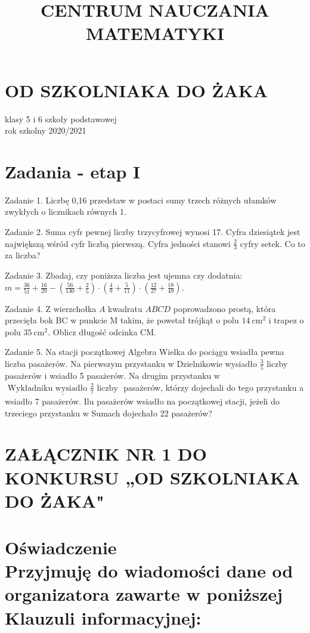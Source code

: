 \documentclass[10pt]{article}
\title{CENTRUM NAUCZANIA MATEMATYKI }
\author{}
\date{}
\begin{document}
\maketitle
\section*{OD SZKOLNIAKA DO ŻAKA}
klasy 5 i 6 szkoły podstawowej\\
rok szkolny 2020/2021

\section*{Zadania - etap I}
Zadanie 1. Liczbę 0,16 przedstaw w postaci sumy trzech różnych ułamków zwykłych o licznikach równych 1.

Zadanie 2. Suma cyfr pewnej liczby trzycyfrowej wynosi 17. Cyfra dziesiątek jest największą wśród cyfr liczbą pierwszą. Cyfra jedności stanowi \(\frac{2}{3}\) cyfry setek. Co to za liczba?

Zadanie 3. Zbadaj, czy poniższa liczba jest ujemna czy dodatnia:\\
\(m=\frac{36}{51}+\frac{16}{29}-\left(\frac{56}{130}+\frac{2}{5}\right) \cdot\left(\frac{4}{9}+\frac{5}{11}\right) \cdot\left(\frac{12}{27}+\frac{18}{49}\right)\).

Zadanie 4. Z wierzchołka \(A\) kwadratu \(A B C D\) poprowadzono prostą, która przecięła bok BC w punkcie M takim, że powstał trójkąt o polu \(14 \mathrm{~cm}^{2}\) i trapez o polu \(35 \mathrm{~cm}^{2}\). Oblicz długość odcinka CM.

Zadanie 5. Na stacji początkowej Algebra Wielka do pociągu wsiadła pewna liczba pasażerów. Na pierwszym przystanku w Dzielnikowie wysiadło \(\frac{3}{5}\) liczby pasażerów i wsiadło 5 pasażerów. Na drugim przystanku w \(\underline{\text { Wykładniku wysiadło } \frac{2}{7} \text { liczby }}\) pasażerów, którzy dojechali do tego przystanku a wsiadło 7 pasażerów. Ilu pasażerów wsiadło na początkowej stacji, jeżeli do trzeciego przystanku w Sumach dojechało 22 pasażerów?

\section*{ZAŁĄCZNIK NR 1 DO KONKURSU „OD SZKOLNIAKA DO ŻAKA"}
\section*{Oświadczenie \\
 Przyjmuję do wiadomości dane od organizatora zawarte w poniższej Klauzuli informacyjnej:}
\end{document}
